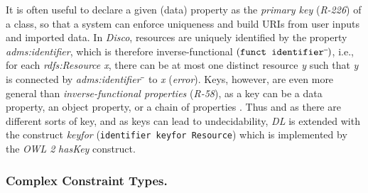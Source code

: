 \documentclass{llncs}
\newcommand{\ms}[1]{\texttt{#1}}
\newenvironment{DL}{
  \small
  \vspace{0cm}
	\begin{center}
  \begin{tabular}{c l}

}{
  \end{tabular}
	\end{center}
}
\begin{document}

It is often useful to declare a given (data) property as the \emph{primary key} (\emph{R-226}) of a class, so that a system can enforce uniqueness and build URIs from user inputs and imported data. 
In \emph{Disco}, resources are uniquely identified by the property \emph{adms:identifier},
which is therefore inverse-functional $(\ms{funct identifier}\sp{\overline{\ }})$,
i.e., for each \emph{rdfs:Resource x}, there can be at most one distinct resource \emph{y} such that \emph{y} is connected by \emph{adms:identifier$\sp{\overline{\ }}$} to \emph{x} (\emph{error}).
Keys, however, are even more general than \emph{inverse-functional properties} (\emph{R-58}),
as a key can be a data property, an object property, or a chain of properties \cite{Schneider2009}.
Thus and as there are different sorts of key, and as keys can lead to undecidability, 
\emph{DL} is extended with the construct \emph{keyfor} (\ms{identifier \ms{keyfor} Resource}) \cite{Lutz2005} which is implemented by the \emph{OWL 2} \emph{hasKey} construct.

\subsubsection*{Complex Constraint Types.}
\label{complex-constraint-types}

\end{document}
